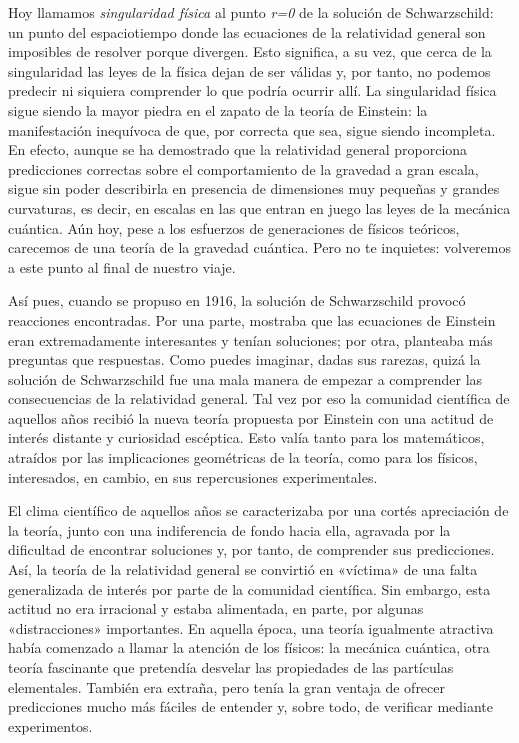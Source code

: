 Hoy llamamos \emph{singularidad física} al punto \emph{r=0} de la solución de Schwarzschild: un punto del espaciotiempo donde las ecuaciones de la relatividad general son imposibles de resolver porque divergen. Esto significa, a su vez, que cerca de la singularidad las leyes de la física dejan de ser válidas y, por tanto, no podemos predecir ni siquiera comprender lo que podría ocurrir allí. La singularidad física sigue siendo la mayor piedra en el zapato de la teoría de Einstein: la manifestación inequívoca de que, por correcta que sea, sigue siendo incompleta. En efecto, aunque se ha demostrado que la relatividad general proporciona predicciones correctas sobre el comportamiento de la gravedad a gran escala, sigue sin poder describirla en presencia de dimensiones muy pequeñas y grandes curvaturas, es decir, en escalas en las que entran en juego las leyes de la mecánica cuántica. Aún hoy, pese a los esfuerzos de generaciones de físicos teóricos, carecemos de una teoría de la gravedad cuántica. Pero no te inquietes: volveremos a este punto al final de nuestro viaje.

Así pues, cuando se propuso en 1916, la solución de Schwarzschild provocó reacciones encontradas. Por una parte, mostraba que las ecuaciones de Einstein eran extremadamente interesantes y tenían soluciones; por otra, planteaba más preguntas que respuestas. Como puedes imaginar, dadas sus rarezas, quizá la solución de Schwarzschild fue una mala manera de empezar a comprender las consecuencias de la relatividad general. Tal vez por eso la comunidad científica de aquellos años recibió la nueva teoría propuesta por Einstein con una actitud de interés distante y curiosidad escéptica. Esto valía tanto para los matemáticos, atraídos por las implicaciones geométricas de la teoría, como para los físicos, interesados, en cambio, en sus repercusiones experimentales.

El clima científico de aquellos años se caracterizaba por una cortés apreciación de la teoría, junto con una indiferencia de fondo hacia ella, agravada por la dificultad de encontrar soluciones y, por tanto, de comprender sus predicciones. Así, la teoría de la relatividad general se convirtió en «víctima» de una falta generalizada de interés por parte de la comunidad científica. Sin embargo, esta actitud no era irracional y estaba alimentada, en parte, por algunas «distracciones» importantes. En aquella época, una teoría igualmente atractiva había comenzado a llamar la atención de los físicos: la mecánica cuántica, otra teoría fascinante que pretendía desvelar las propiedades de las partículas elementales. También era extraña, pero tenía la gran ventaja de ofrecer predicciones mucho más fáciles de entender y, sobre todo, de verificar mediante experimentos.

